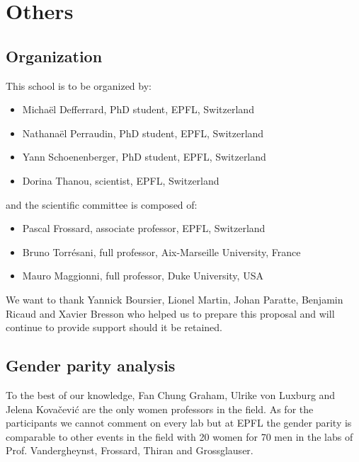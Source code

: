 \documentclass[a4paper]{scrartcl}
\begin{document}
\section{Others}

\subsection{Organization}

This school is to be organized by:
\begin{itemize}
	\setlength{\itemsep}{0pt} \setlength{\parskip}{0pt}
	\item Michaël Defferrard, PhD student, EPFL, Switzerland
	\item Nathanaël Perraudin, PhD student, EPFL, Switzerland
	\item Yann Schoenenberger, PhD student, EPFL, Switzerland
	\item Dorina Thanou, scientist, EPFL, Switzerland
\end{itemize}
and the scientific committee is composed of:
\begin{itemize}
	\setlength{\itemsep}{0pt} \setlength{\parskip}{0pt}
	\item Pascal Frossard, associate professor, EPFL, Switzerland
	\item Bruno Torrésani, full professor, Aix-Marseille University, France
	\item Mauro Maggionni, full professor, Duke University, USA
\end{itemize}

We want to thank Yannick Boursier, Lionel Martin, Johan Paratte, Benjamin Ricaud
and Xavier Bresson who helped us to prepare this proposal and will continue to
provide support should it be retained.

\subsection{Gender parity analysis}

To the best of our knowledge, Fan Chung Graham, Ulrike von Luxburg and Jelena
Kovačević are the only women professors in the field. As for the participants we
cannot comment on every lab but at EPFL the gender parity is comparable to other
events in the field with 20 women for 70 men in the labs of Prof. Vandergheynst,
Frossard, Thiran and Grossglauser.
\end{document}
